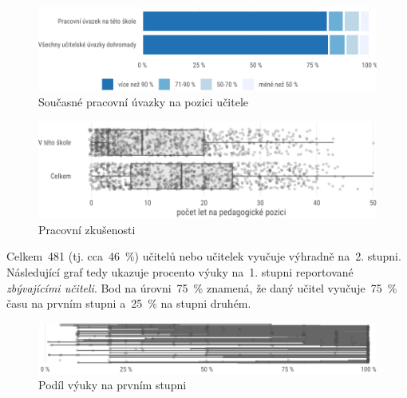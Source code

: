 \documentclass[12pt,a4paper,]{report}
\begin{document}
\begin{figure}

{\centering \includegraphics[width=\textwidth]{figs/job-1} 

}

\caption{Současné pracovní úvazky na pozici učitele}\label{fig:job}
\end{figure}

\begin{figure}

{\centering \includegraphics[width=\textwidth]{figs/yearsTeach-1} 

}

\caption{Pracovní zkušenosti}\label{fig:yearsTeach}
\end{figure}

Celkem~481 (tj. cca~46~\%) učitelů nebo učitelek vyučuje výhradně na~2. stupni. Následující graf tedy ukazuje procento výuky na~1. stupni reportované \emph{zbývajícími učiteli}. Bod na úrovni~75~\% znamená, že daný učitel vyučuje~75~\% času na prvním stupni a~25~\% na stupni druhém.

\begin{figure}

{\centering \includegraphics[width=\textwidth]{figs/s8q2-1} 

}

\caption{Podíl výuky na prvním stupni}\label{fig:s8q2}
\end{figure}
\end{document}

